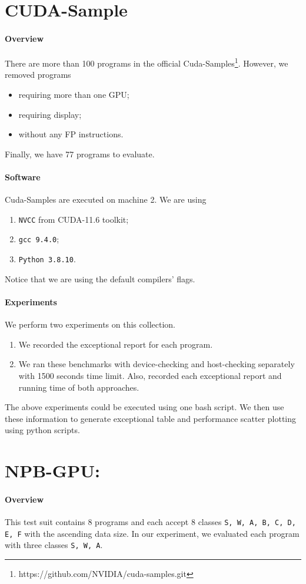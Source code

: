 \documentclass{article}
\begin{document}
	\section{CUDA-Sample}
	\paragraph{Overview} There are more than 100 programs in the official Cuda-Samples\footnote{https://github.com/NVIDIA/cuda-samples.git}. However, we removed programs
	\begin{itemize}
		\item requiring more than one GPU;
		\item requiring display;
		\item without any FP instructions.
	\end{itemize} 
	Finally, we have 77 programs to evaluate.
	\paragraph{Software} Cuda-Samples are executed on machine 2. We are using
	\begin{enumerate}
		\item {\tt NVCC} from CUDA-11.6 toolkit;
		\item {\tt gcc 9.4.0}; 
		\item {\tt Python 3.8.10}.
	\end{enumerate} 
	Notice that we are using the default compilers' flags. 
	\paragraph{Experiments}
	We perform two experiments on this collection.
	\begin{enumerate}
		\item We recorded the exceptional report for each program.
		\item  We ran these benchmarks with device-checking and host-checking separately with 1500 seconds time limit. Also, recorded each exceptional report and running time of both approaches.
	\end{enumerate}
	The above experiments could be executed using one bash script. We then use these information to generate exceptional table and performance scatter plotting using python scripts.  
	\section{NPB-GPU: }
	\paragraph{Overview}  This test suit contains 8 programs and each accept 8 classes {\tt S, W, A, B, C, D, E, F} with the ascending data size. In our experiment, we evaluated each program with three classes {\tt S, W, A}.
\end{document}
